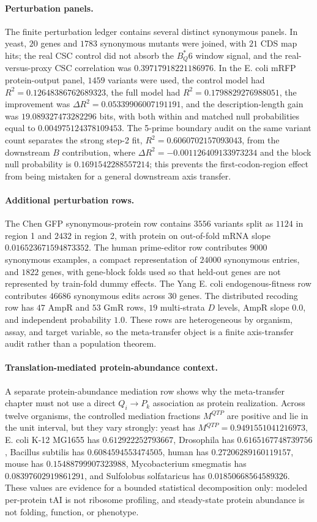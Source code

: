 \paragraph{Perturbation panels.}
The finite perturbation ledger contains several distinct synonymous panels.  In yeast, $20$ genes and $1783$ synonymous mutants were joined, with $21$ CDS map hits; the real CSC control did not absorb the $B^*_Q6$ window signal, and the real-versus-proxy CSC correlation was $0.39717918221186976$.  In the E. coli mRFP protein-output panel, $1459$ variants were used, the control model had $R^2=0.12648386762689323$, the full model had $R^2=0.1798829276988051$, the improvement was $\Delta R^2=0.05339906007191191$, and the description-length gain was $19.089327473282296$ bits, with both within and matched null probabilities equal to $0.004975124378109453$.  The 5-prime boundary audit on the same variant count separates the strong step-2 fit, $R^2=0.6060702157093043$, from the downstream $B$ contribution, where $\Delta R^2=-0.001126409133973234$ and the block null probability is $0.1691542288557214$; this prevents the first-codon-region effect from being mistaken for a general downstream axis transfer.

\paragraph{Additional perturbation rows.}
The Chen GFP synonymous-protein row contains $3556$ variants split as $1124$ in region 1 and $2432$ in region 2, with protein on out-of-fold mRNA slope $0.016523671594873352$.  The human prime-editor row contributes $9000$ synonymous examples, a compact representation of $24000$ synonymous entries, and $1822$ genes, with gene-block folds used so that held-out genes are not represented by train-fold dummy effects.  The Yang E. coli endogenous-fitness row contributes $46686$ synonymous edits across $30$ genes.  The distributed recoding row has $47$ AmpR and $53$ GmR rows, $19$ multi-strata $D$ levels, AmpR slope $0.0$, and independent probability $1.0$.  These rows are heterogeneous by organism, assay, and target variable, so the meta-transfer object is a finite axis-transfer audit rather than a population theorem.

\paragraph{Translation-mediated protein-abundance context.}
A separate protein-abundance mediation row shows why the meta-transfer chapter must not use a direct $Q_i\to P_k$ association as protein realization.  Across twelve organisms, the controlled mediation fractions $M^{QTP}$ are positive and lie in the unit interval, but they vary strongly: yeast has $M^{QTP}=0.9491551041216973$, E. coli K-12 MG1655 has $0.612922252793667$, Drosophila has $0.6165167748739756$, Bacillus subtilis has $0.6084594553474505$, human has $0.27206289160119157$, mouse has $0.15488799907323988$, Mycobacterium smegmatis has $0.08397602919861291$, and Sulfolobus solfataricus has $0.01850668564589326$.  These values are evidence for a bounded statistical decomposition only: modeled per-protein tAI is not ribosome profiling, and steady-state protein abundance is not folding, function, or phenotype.

